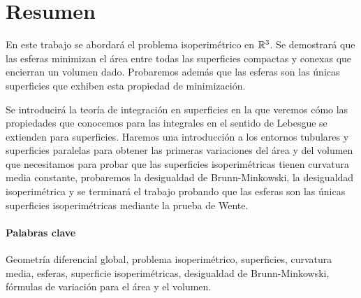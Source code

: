 \section{Resumen}

En este trabajo se abordará el problema isoperimétrico en $\mathbb{R}^3$. Se demostrará que las esferas minimizan el área entre todas las superficies compactas y conexas que encierran un volumen dado. Probaremos además que las esferas son las únicas superficies que exhiben esta propiedad de minimización.

Se introducirá la teoría de integración en superficies en la que veremos cómo las propiedades que conocemos para las integrales en el sentido de Lebesgue se extienden para superficies. Haremos una introducción a los entornos tubulares y superficies paralelas para obtener las primeras variaciones del área y del volumen que necesitamos para probar que las superficies isoperimétricas tienen curvatura media constante, probaremos la desigualdad de Brunn-Minkowski, la desigualdad isoperimétrica y se terminará el trabajo probando que las esferas son las únicas superficies isoperimétricas mediante la prueba de Wente.

\paragraph{Palabras clave} Geometría diferencial global, problema isoperimétrico, superficies, curvatura media, esferas, superficie isoperimétricas, desigualdad de Brunn-Minkowski, fórmulas de variación para el área y el volumen.

\newpage
